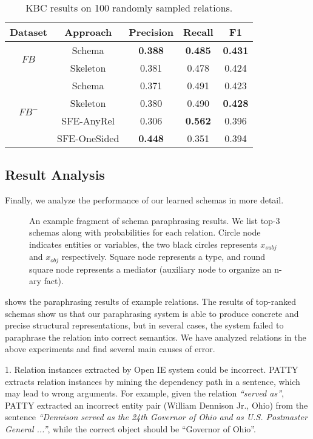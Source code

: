 \begin{table}[ht]
	\small
	\centering
	\caption{KBC results on 100 randomly sampled relations.}
	\begin{tabular}{|c||c|c|c|c|}
		\hline
		Dataset					& Approach	& Precision & Recall & F1 \\
        \hline
		\multirow{2}{*}{$FB$}	& Schema	& \textbf{0.388} & \textbf{0.485} & \textbf{0.431} \\
		\cline{2-5}
        						& Skeleton	& 0.381 & 0.478 & 0.424 \\
		\hline
		\multirow{4}{*}{$FB^-$} & Schema		& 0.371 & 0.491 & 0.423 \\
		\cline{2-5}
								& Skeleton		& 0.380	& 0.490	& \textbf{0.428}	\\
		\cline{2-5}
								& SFE-AnyRel	& 0.306	& \textbf{0.562} & 0.396	\\
		\cline{2-5}
								& SFE-OneSided	& \textbf{0.448}	& 0.351 & 0.394	\\
		\hline
	\end{tabular}
	\label{tab:kbc-ordinary}
\end{table}


\subsection{Result Analysis}
Finally, we analyze the performance of our learned schemas in more detail.
\begin{figure*}[th]
\centering
\caption{An example fragment of schema paraphrasing results.
We list top-3 schemas along with probabilities for each relation.
Circle node indicates entities or variables, the two black circles represents
$x_{subj}$ and $x_{obj}$ respectively. Square node represents a type, and
round square node represents a mediator (auxiliary node to organize an n-ary fact).}
\label{fig:relation-example}
\end{figure*}
 shows the paraphrasing results of example relations.
The results of top-ranked schemas show us that our paraphrasing system
is able to produce concrete and precise structural representations,
but in several cases, the system failed to paraphrase the relation into
correct semantics. We have analyzed relations in the above experiments and
find several main causes of error.

1. Relation instances extracted by Open IE system could be incorrect.
PATTY extracts relation instances by mining the dependency path in a sentence,
which may lead to wrong arguments.
For example, given the relation \textit{``served as''}, PATTY extracted
an incorrect entity pair (William Dennison Jr., Ohio) from the sentence
\textit{``Dennison served as the 24th Governor of Ohio and as U.S. Postmaster General ...''},
while the correct object should be ``Governor of Ohio''.

